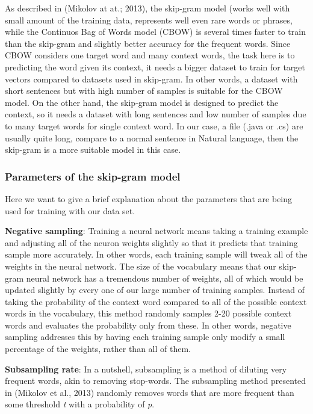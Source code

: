 As described in (Mikolov at at.; 2013)\cite{mikolov2013distributed}, the skip-gram model (works well with small amount of the training data, represents well even rare words or phrases, while the Continuos Bag of Words model (CBOW) is several times faster to train than the skip-gram and slightly better accuracy for the frequent words. Since CBOW considers one target word and many context words, the task here is to predicting the word given its context, it needs a bigger dataset to train for target vectors compared to datasets used in skip-gram. In other words, a dataset with short sentences but with high number of samples is suitable for the CBOW model. On the other hand, the skip-gram model is designed to predict the context, so it needs a dataset with long sentences and low number of samples due to many target words for single context word. In our case, a file (.java or .cs) are usually quite long, compare to a normal sentence in Natural language, then the skip-gram is a more suitable model in this case. 


\subsubsection{ Parameters of the skip-gram model}
Here we want to give a brief explanation about the parameters that are being used for training with our data set.

\textbf{Negative sampling}: Training a neural network means taking a training example and adjusting all of the neuron weights slightly so that it predicts that training sample more accurately. In other words, each training sample will tweak all of the weights in the neural network. The size of the vocabulary means that our skip-gram neural network has a tremendous number of weights, all of which would be updated slightly by every one of our large number of training samples. Instead of taking the probability of the context word compared to all of the possible context words in the vocabulary, this method randomly samples 2-20 possible context words and evaluates the probability only from these. In other words, negative sampling addresses this by having each training sample only modify a small percentage of the weights, rather than all of them.
	
\textbf{Subsampling rate}: In a nutshell, subsampling is a method of diluting very frequent words, akin to removing stop-words. The subsampling method presented in (Mikolov et al., 2013) \cite{mikolov2013distributed} randomly removes words that are more frequent than some threshold \textit{t} with a probability of \textit{p}.
	
